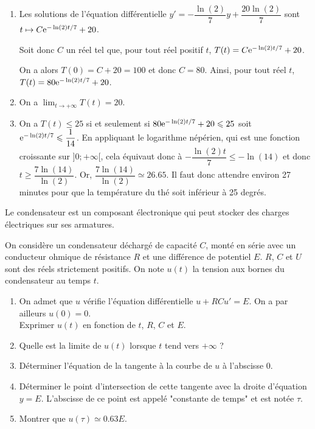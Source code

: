 \documentclass[11pt,fleqn, openany]{book} %
\begin{document}
\begin{solution} \hspace{0pt}
\begin{enumerate}\item Les solutions de l'équation différentielle \(y'=-\dfrac{\ln(2)}{7}y+\dfrac{20\ln(2)}{7}\) sont \(t\mapsto C\mathrm{e}^{-\ln(2)t/7}+20\). 

Soit donc \(C\) un réel tel que, pour tout réel positif \(t\), \(T(t)=C\mathrm{e}^{-\ln(2)t/7}+20\). 

On a alors \(T(0)=C+20=100\) et donc \(C=80\). Ainsi, pour tout réel \(t\), \(T(t)=80\mathrm{e}^{-\ln(2)t/7}+20\).
	\item On a \(\displaystyle\lim_{t\to +\infty}T(t)=20\).
	\item  On a \(T(t) \leqslant 25\) si et seulement si \(80\mathrm{e}^{-\ln(2)t/7}+20 \leqslant 25\) soit \(\mathrm{e}^{-\ln(2)t/7} \leqslant \dfrac{1}{14}\). En appliquant le logarithme népérien, qui est une fonction croissante sur \(]0;+\infty[\), cela équivaut donc à \(-\dfrac{\ln(2)t}{7} \leqslant - \ln(14)\) et donc \(t \geqslant \dfrac{7\ln(14)}{\ln(2)}\). Or, \(\dfrac{7\ln(14)}{\ln(2)} \simeq 26.65\). Il faut donc attendre environ 27 minutes pour que la température du thé soit inférieur à 25 degrés.\end{enumerate}

 \end{solution}
 
 


\begin{exercise}[subtitle={(Circuit RC)}]Le condensateur est un composant électronique qui peut stocker des charges électriques sur ses armatures.

On considère un condensateur déchargé de capacité $C$, monté en série avec un conducteur ohmique de résistance $R$ et une différence de potentiel $E$. $R$, $C$ et $U$ sont des réels strictement positifs. On note $u(t)$ la tension aux bornes du condensateur au temps $t$.
\begin{enumerate}
\item On admet que $u$ vérifie l'équation différentielle $u+RCu'=E$. On a par ailleurs $u(0)=0$. \\ Exprimer $u(t)$ en fonction de $t$, $R$, $C$ et $E$.
\item Quelle est la limite de $u(t)$ lorsque $t$ tend vers $+\infty$ ?
\item Déterminer l'équation de la tangente à la courbe de $u$ à l'abscisse 0.
\item Déterminer le point d'intersection de cette tangente avec la droite d'équation $y=E$. L'abscisse de ce point est appelé "constante de temps" et est notée $\tau$.
\item Montrer que $u(\tau)\simeq 0.63 E$.
\end{enumerate}\newpage \end{exercise}
\end{document}
